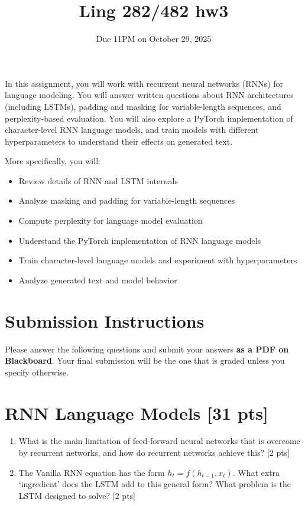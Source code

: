 \documentclass[11pt]{article}
\begin{document}
\title{Ling 282/482 hw3}
\date{\vspace{-0.2in}Due 11PM on October 29, 2025}
\maketitle

\noindent In this assignment, you will work with recurrent neural networks (RNNs) for language modeling. You will answer written questions about RNN architectures (including LSTMs), padding and masking for variable-length sequences, and perplexity-based evaluation. You will also explore a PyTorch implementation of character-level RNN language models, and train models with different hyperparameters to understand their effects on generated text.

\noindent More specifically, you will:
\begin{itemize}
    \item Review details of RNN and LSTM internals
    \item Analyze masking and padding for variable-length sequences
    \item Compute perplexity for language model evaluation
    \item Understand the PyTorch implementation of RNN language models
    \item Train character-level language models and experiment with hyperparameters
    \item Analyze generated text and model behavior
\end{itemize}

\section*{Submission Instructions}
\noindent Please answer the following questions and submit your answers \textbf{as a PDF on Blackboard}. Your final submission will be the one that is graded unless you specify otherwise.


\section{RNN Language Models [31 pts]}

\begin{enumerate}[label=\alph*., itemsep=2em]
  \item What is the main limitation of feed-forward neural networks that is overcome by recurrent networks, and how do recurrent networks achieve this? [2 pts]
  \item The Vanilla RNN equation has the form $h_t = f(h_{t-1}, x_t)$.  What extra `ingredient' does the LSTM add to this general form?  What problem is the LSTM designed to solve? [2 pts]
\end{enumerate}
\end{document}
